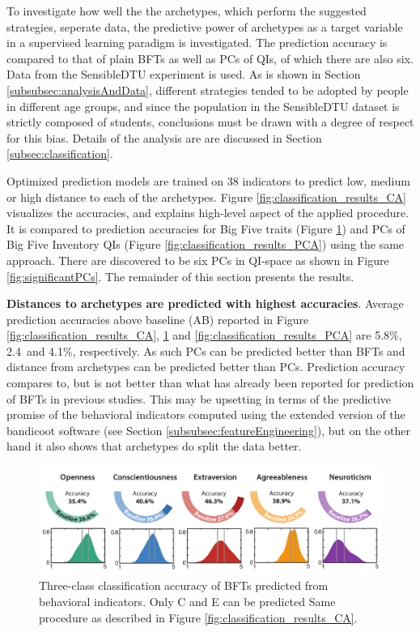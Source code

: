 To investigate how well the the archetypes, which perform the suggested strategies, seperate data, the predictive power of archetypes as a target variable in a supervised learning paradigm is investigated. The prediction accuracy is compared to that of plain BFTs as well as PCs of QIs, of which there are also six. Data from the SensibleDTU experiment is used. As is shown in Section \ref{subsubsec:analysisAndData}, different strategies tended to be adopted by people in different age groups, and since the population in the SensibleDTU dataset is strictly composed of students, conclusions must be drawn with a degree of respect for this bias. Details of the analysis are are discussed in Section \ref{subsec:classification}.

Optimized prediction models are trained on 38 indicators to predict low, medium or high distance to each of the archetypes. Figure \ref{fig:classification_results_CA} visualizes the accuracies, and explains high-level aspect of the applied procedure. It is compared to prediction accuracies for Big Five traits (Figure \ref{fig:classification_results_BFT}) and PCs of Big Five Inventory QIs (Figure \ref{fig:classification_results_PCA}) using the same approach. There are discovered to be six PCs in QI-space as shown in Figure \ref{fig:significantPCs}. The remainder of this section presents the results.

\textbf{Distances to archetypes are predicted with highest accuracies}.
Average prediction accuracies above baseline (AB) reported in Figure \ref{fig:classification_results_CA}, \ref{fig:classification_results_BFT} and \ref{fig:classification_results_PCA} are 5.8\%, 2.4\ and 4.1\%, respectively. As such PCs can be predicted better than BFTs and distance from archetypes can be predicted better than PCs. Prediction accuracy compares to, but is not better than what has already been reported for prediction of BFTs in previous studies. This may be upsetting in terms of the predictive promise of the behavioral indicators computed using the extended version of the bandicoot software (see Section \ref{subsubsec:featureEngineering}), but on the other hand it also shows that archetypes do split the data better.

\begin{figure}[b]
	\centering
	\includegraphics[width=\textwidth]{figures/classification_results}
	\caption{\label{fig:classification_results_BFT} Three-class classification accuracy of BFTs predicted from behavioral indicators. Only C and E can be predicted Same procedure as described in Figure \ref{fig:classification_results_CA}.}
\end{figure}

